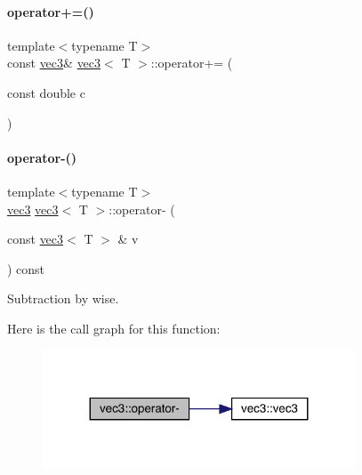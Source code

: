 \mbox{\label{structvec3_aaec435599c22237b677b14fed2dad9d2}} 
\paragraph{\texorpdfstring{operator+=()}{operator+=()}\hspace{0.1cm}{\footnotesize\ttfamily [2/2]}}
{\footnotesize\ttfamily template$<$typename T$>$ \\
const \mbox{\hyperlink{structvec3}{vec3}}\& \mbox{\hyperlink{structvec3}{vec3}}$<$ T $>$\+::operator+= (\begin{DoxyParamCaption}\item[{const double}]{c }\end{DoxyParamCaption})\hspace{0.3cm}{\ttfamily [inline]}}

\mbox{\label{structvec3_a62ca43535073d9711fe179e26a412e32}} 
\paragraph{\texorpdfstring{operator-\/()}{operator-()}\hspace{0.1cm}{\footnotesize\ttfamily [1/3]}}
{\footnotesize\ttfamily template$<$typename T$>$ \\
\mbox{\hyperlink{structvec3}{vec3}} \mbox{\hyperlink{structvec3}{vec3}}$<$ T $>$\+::operator-\/ (\begin{DoxyParamCaption}\item[{const \mbox{\hyperlink{structvec3}{vec3}}$<$ T $>$ \&}]{v }\end{DoxyParamCaption}) const\hspace{0.3cm}{\ttfamily [inline]}}



Subtraction by wise. 

Here is the call graph for this function\+:\nopagebreak
\begin{figure}[H]
\begin{center}
\leavevmode
\includegraphics[width=263pt]{structvec3_a62ca43535073d9711fe179e26a412e32_cgraph}
\end{center}
\end{figure}
\mbox{\label{structvec3_a00615545da4a7f61be923dc8c4e0557e}} 
